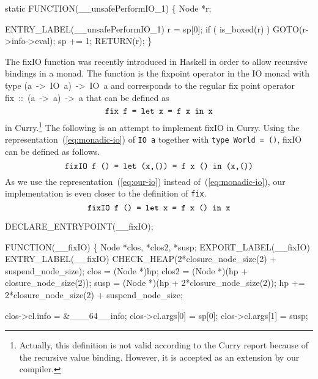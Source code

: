static
FUNCTION(__unsafePerformIO_1)
\{
    Node *r;

 ENTRY_LABEL(__unsafePerformIO_1)
    r = sp[0];
    if ( is_boxed(r) )
        GOTO(r->info->eval);
    sp += 1;
    RETURN(r);
\}

\nwendcode{}\nwdocspar
The {\Tt{}fixIO\nwendquote} function was recently introduced in Haskell in order to
allow recursive bindings in a monad. The function is the fixpoint
operator in the IO monad with type {\Tt{}(a\ ->\ IO\ a)\ ->\ IO\ a\nwendquote} and
corresponds to the regular fix point operator {\Tt{}fix\ ::\ (a\ ->\ a)\ ->\ a\nwendquote}
that can be defined as
\begin{equation}
  \mbox{\texttt{fix f = let x = f x in x}}\label{eq:fix}
\end{equation}
in Curry.\footnote{Actually, this definition is not valid according to
the Curry report because of the recursive value binding. However, it
is accepted as an extension by our compiler.} The following is an
attempt to implement fixIO in Curry. Using the
representation~(\ref{eq:monadic-io}) of \texttt{IO a} together with
\texttt{type World = ()}, {\Tt{}fixIO\nwendquote} can be defined as follows.
\begin{equation}
  \mbox{\texttt{fixIO f () = let (x,()) = f x () in (x,())}}\label{eq:fixIO}
\end{equation}
As we use the representation~(\ref{eq:our-io}) instead
of~(\ref{eq:monadic-io}), our implementation is even closer to the
definition of \texttt{fix}.
\begin{equation}
  \mbox{\texttt{fixIO f () = let x = f x () in x}}\label{eq:our-fixIO}
\end{equation}

\nwenddocs{}\plusendmoddef\nwstartdeflinemarkup{}\nwenddeflinemarkup
DECLARE_ENTRYPOINT(__fixIO);

FUNCTION(__fixIO)
\{
    Node *clos, *clos2, *susp;
    EXPORT_LABEL(__fixIO)
 ENTRY_LABEL(__fixIO)
    CHECK_HEAP(2*closure_node_size(2) + suspend_node_size);
    clos  = (Node *)hp;
    clos2 = (Node *)(hp + closure_node_size(2));
    susp  = (Node *)(hp + 2*closure_node_size(2));
    hp   += 2*closure_node_size(2) + suspend_node_size;

    clos->cl.info    = &___64__info;
    clos->cl.args[0] = sp[0];
    clos->cl.args[1] = susp;

